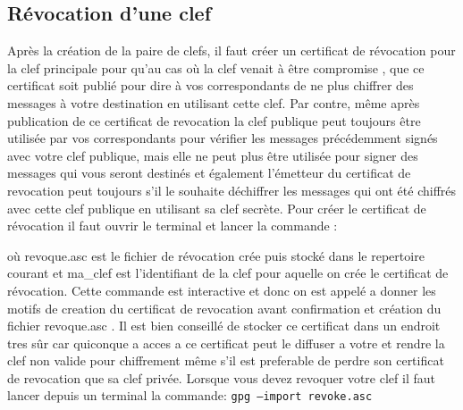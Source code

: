  
\subsection {Révocation d'une clef}
 Après la création de la paire de clefs, il faut créer un certificat de révocation pour la clef principale pour qu'au cas où la clef
venait à être compromise , que ce certificat soit publié pour dire à vos correspondants de ne plus chiffrer des messages à votre
destination en utilisant cette  clef. Par contre, même après publication de ce certificat de revocation la clef publique peut toujours 
être utilisée par vos correspondants pour vérifier les messages précédemment signés avec votre clef publique, mais elle ne peut plus 
être utilisée pour signer des messages qui vous seront destinés et également l'émetteur du certificat de revocation peut toujours 
s'il  le souhaite déchiffrer les messages qui ont été chiffrés avec cette clef publique en utilisant sa clef secrète.
Pour créer le certificat de révocation il faut ouvrir le terminal et lancer la commande : 

où revoque.asc est le fichier de révocation crée puis stocké dans le repertoire courant et ma\_clef est l'identifiant de la clef pour
aquelle on crée le certificat de révocation.
Cette commande est interactive et donc on est appelé a donner les motifs de creation du certificat de revocation avant confirmation et 
création du fichier revoque.asc .
Il est bien conseillé de stocker ce certificat dans un endroit tres sûr car quiconque a acces a ce certificat peut le diffuser a votre 
et rendre la clef non valide pour chiffrement même s'il est preferable de perdre son certificat de revocation que sa clef privée.
Lorsque vous devez revoquer votre clef il faut lancer depuis un terminal la commande:
\texttt{gpg --import revoke.asc } \\





